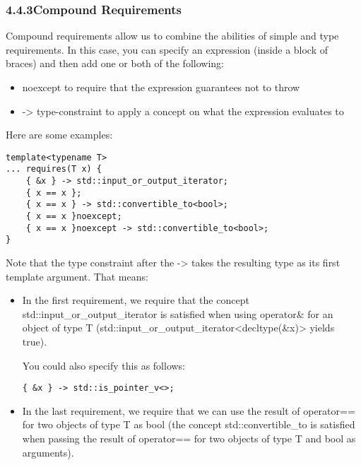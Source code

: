 \subsubsection*{ 4.4.3\hspace{0.2cm}Compound Requirements}

Compound requirements allow us to combine the abilities of simple and type requirements. In this case, you can specify an expression (inside a block of braces) and then add one or both of the following:

\begin{itemize}
\item
noexcept to require that the expression guarantees not to throw

\item
-> type-constraint to apply a concept on what the expression evaluates to
\end{itemize}

Here are some examples:

\begin{lstlisting}[style=styleCXX]
template<typename T>
... requires(T x) {
	{ &x } -> std::input_or_output_iterator;
	{ x == x };
	{ x == x } -> std::convertible_to<bool>;
	{ x == x }noexcept;
	{ x == x }noexcept -> std::convertible_to<bool>;
}
\end{lstlisting}

Note that the type constraint after the -> takes the resulting type as its first template argument. That means:

\begin{itemize}
\item
In the first requirement, we require that the concept std::input\_or\_output\_iterator is satisfied when using operator\& for an object of type T (std::input\_or\_output\_iterator<decltype(\&x)> yields true).

You could also specify this as follows:

\begin{lstlisting}[style=styleCXX]
{ &x } -> std::is_pointer_v<>;
\end{lstlisting}

\item
In the last requirement, we require that we can use the result of operator== for two objects of type T as bool (the concept std::convertible\_to is satisfied when passing the result of operator== for two objects of type T and bool as arguments).
\end{itemize}

